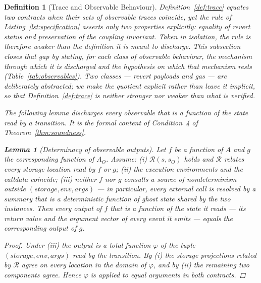 \documentclass[manuscript,screen,review]{acmart}
\newenvironment{revisedblock}{\color{red}}{}
\newtheorem{definition}{Definition}
\newtheorem{lemma}{Lemma}
\begin{document}
\begin{definition}[Trace and Observable Behaviour]
\begin{revisedblock}
Definition~\ref{def:trace} equates two contracts when their sets of observable
traces coincide, yet the rule of Listing~\ref{lst:specification} asserts only
two properties explicitly: equality of revert status and preservation of the
coupling invariant. Taken in isolation, the rule is therefore weaker than the
definition it is meant to discharge. This subsection closes that gap by
stating, for each class of observable behaviour, the mechanism through which it
is discharged and the hypothesis on which that mechanism rests
(Table~\ref{tab:observables}). Two classes --- revert payloads and gas --- are
deliberately abstracted; we make the quotient explicit rather than leave it
implicit, so that Definition~\ref{def:trace} is neither stronger nor weaker
than what is verified.

The following lemma discharges every observable that is a function of the state
read by a transition. It is the formal content of Condition~4 of
Theorem~\ref{thm:soundness}.

\begin{lemma}[Determinacy of observable outputs]
\label{lem:determinacy}
Let $f$ be a function of $A$ and $g$ the corresponding function of $A_O$.
Assume: (i) $\mathcal{R}(s,s_O)$ holds and $\mathcal{R}$ relates every storage
location read by $f$ or $g$; (ii) the execution environments and the calldata
coincide; (iii) neither $f$ nor $g$ consults a source of nondeterminism outside
$(\textit{storage}, \mathit{env}, \mathit{args})$ --- in particular, every
external call is resolved by a summary that is a deterministic function of
ghost state shared by the two instances. Then every output of $f$ that is a
function of the state it reads --- its return value and the argument vector of
every event it emits --- equals the corresponding output of $g$.
\end{lemma}

\begin{proof}
Under (iii) the output is a total function $\varphi$ of the tuple
$(\textit{storage}, \mathit{env}, \mathit{args})$ read by the transition. By
(i) the storage projections related by $\mathcal{R}$ agree on every location in
the domain of $\varphi$, and by (ii) the remaining two components agree. Hence
$\varphi$ is applied to equal arguments in both contracts.
\end{proof}


\end{revisedblock}
\end{definition}
\end{document}
